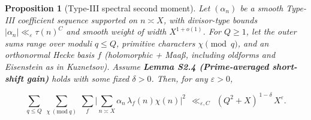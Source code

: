 \documentclass[11pt]{article}
\newtheorem{proposition}[lemma]{Proposition}
\theoremstyle{definition}
\theoremstyle{remark}
\numberwithin{equation}{part}
\begin{document}
\begin{proposition}[Type-III spectral second moment]\label{prop:typeIII}
	Let $(\alpha_n)$ be a smooth Type-III coefficient sequence supported on $n\asymp X$, with divisor-type bounds $|\alpha_n|\ll_\varepsilon \tau(n)^C$ and smooth weight of width $X^{1+o(1)}$. For $Q\ge 1$, let the outer sums range over moduli $q\le Q$, primitive characters $\chi\pmod q$, and an orthonormal Hecke basis $f$ (holomorphic + Maa\ss, including oldforms and Eisenstein as in Kuznetsov). Assume \textbf{Lemma S2.4 (Prime-averaged short-shift gain)} holds with some fixed $\delta>0$. Then, for any $\varepsilon>0$,

	$$
		\sum_{q\le Q}\ \sum_{\chi\ (\mathrm{mod}\ q)}\ \sum_{f}
		\Bigg|\sum_{n\asymp X}\alpha_n\,\lambda_f(n)\chi(n)\Bigg|^2
		\ \ \ll_{\varepsilon,C}\ \ (Q^2+X)^{\,1-\delta}\,X^{\varepsilon}.
	$$

\end{proposition}
\end{document}
